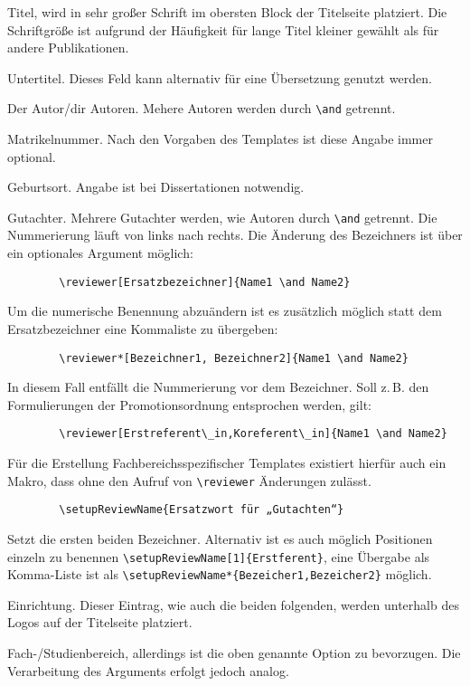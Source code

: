 \documentclass[
	ngerman,
	ruledheaders=chapter,%
	class=book,%
	thesis={
		type=dr,
		dr=rernat
	},
	accentcolor=9c,%
	custommargins=true,%
	marginpar=false,%
	fontsize=11pt,%
]{tudapub}
\begin{document}
\begin{description}
	\item[title] Titel, wird in sehr großer Schrift im obersten Block der Titelseite platziert. Die Schriftgröße ist aufgrund der Häufigkeit für lange Titel kleiner gewählt als für andere Publikationen.
	\item[subtitle] Untertitel. Dieses Feld kann alternativ für eine Übersetzung genutzt werden.
	\item[author] Der Autor/dir Autoren. Mehere Autoren werden durch \verb+\and+ getrennt.
	\item[studentID] Matrikelnummer. Nach den Vorgaben des Templates ist diese Angabe immer optional.
	\item[birthplace] Geburtsort. Angabe ist bei Dissertationen notwendig.
	\item[reviewer] Gutachter. Mehrere Gutachter werden, wie Autoren durch \verb+\and+ getrennt. Die Nummerierung läuft von links nach rechts.
	Die Änderung des Bezeichners ist über ein optionales Argument möglich:
	\begin{verbatim}
		\reviewer[Ersatzbezeichner]{Name1 \and Name2}
	\end{verbatim}
	Um die numerische Benennung abzuändern ist es zusätzlich möglich statt dem Ersatzbezeichner eine Kommaliste zu übergeben:
	\begin{verbatim}
		\reviewer*[Bezeichner1, Bezeichner2]{Name1 \and Name2}
	\end{verbatim}
	In diesem Fall entfällt die Nummerierung vor dem Bezeichner. Soll z.\,B. den Formulierungen der Promotionsordnung entsprochen werden, gilt:
	\begin{verbatim}
		\reviewer[Erstreferent\_in,Koreferent\_in]{Name1 \and Name2}
	\end{verbatim}
	Für die Erstellung Fachbereichsspezifischer Templates existiert hierfür auch ein Makro, dass ohne den Aufruf von \verb+\reviewer+ Änderungen zulässt.
	\begin{verbatim}
		\setupReviewName{Ersatzwort für „Gutachten“}
	\end{verbatim}
	Setzt die ersten beiden Bezeichner. Alternativ ist es auch möglich Positionen einzeln zu benennen \verb+\setupReviewName[1]{Erstferent}+, eine Übergabe als Komma-Liste ist als \verb+\setupReviewName*{Bezeicher1,Bezeicher2}+ möglich.
	\item[institution] Einrichtung. Dieser Eintrag, wie auch die beiden folgenden, werden unterhalb des Logos auf der Titelseite platziert.
	\item[department] Fach-/Studienbereich, allerdings ist die oben genannte Option zu bevorzugen. Die Verarbeitung des Arguments erfolgt jedoch analog.


\end{description}
\end{document}
